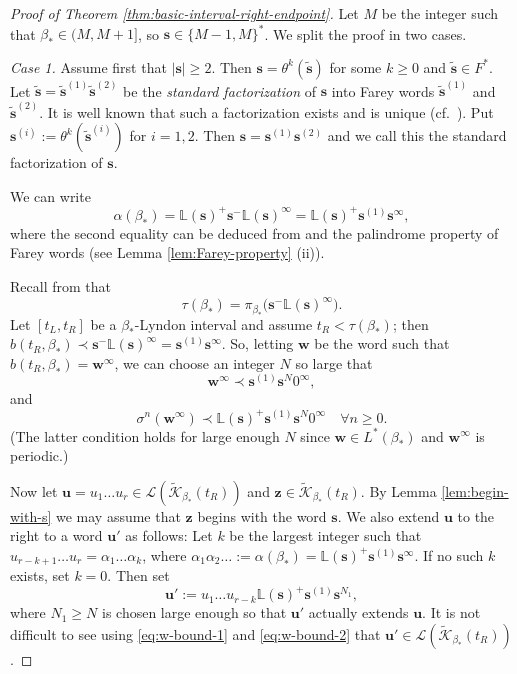 \documentclass[11pt]{amsart}
\theoremstyle{definition}
\theoremstyle{remark}
\numberwithin{equation}{section}
\renewcommand{\L}{\ensuremath{\mathbb{L}}}
\newcommand{\Kt}{\widetilde{\mathcal{K}}}
\newcommand{\s}{ {\mathbf{s}}}
\newcommand{\cL}{\mathcal{L}}
\renewcommand{\u}{\mathbf{u}}
\newcommand{\w}{\mathbf{w}}
\newcommand{\z}{\mathbf{z}}
\newcommand{\f}{\infty}
\begin{document}
\begin{proof}[Proof of Theorem \ref{thm:basic-interval-right-endpoint}]
{Let $M$ be the integer such that $\beta_*\in(M,M+1]$, so $\s\in\{M-1,M\}^*$. We split the proof in two cases.

\medskip
{\em Case 1.} Assume first that $|\s|\geq 2$. Then $\s=\theta^k(\tilde{\s})$ for some $k\geq 0$ and $\tilde{\s}\in F^*$.
Let $\tilde{\s}=\tilde{\s}^{(1)}\tilde{\s}^{(2)}$ be the {\em standard factorization} of $\s$ into Farey words $\tilde{\s}^{(1)}$ and $\tilde{\s}^{(2)}$. It is well known that such a factorization exists and is unique (cf.~\cite{Carminati-Isola-Tiozzo-2018}). Put $\s^{(i)}:=\theta^k(\tilde{\s}^{(i)})$ for $i=1,2$. Then $\s=\s^{(1)}\s^{(2)}$ and we call this the standard factorization of $\s$.}
We can write
\[
\alpha(\beta_*)=\L(\s)^+\s^-\L(\s)^\f=\L(\s)^+\s^{(1)}\s^\f,
\]
where the second equality can be deduced from \cite[Lemma 2.6]{Carminati-Isola-Tiozzo-2018} and the palindrome property of Farey words (see Lemma \ref{lem:Farey-property} (ii)).

Recall from \cite[Theorem 2]{Allaart-Kong-2021} that
\[
\tau(\beta_*)={\pi_{\beta_*}\big( \s^-\L(\s)^\f\big)}.
\]
Let $[t_L,t_R]$ be a $\beta_*$-Lyndon interval and assume $t_R<\tau(\beta_*)$; then $b(t_R,\beta_*)\prec \s^-\L(\s)^\f=\s^{(1)}\s^\f$. So, letting $\w$ be the word such that $b(t_R,\beta_*)=\w^\f$, we can choose an integer $N$ so large that
\begin{equation} \label{eq:w-bound-1}
\w^\f\prec \s^{(1)}\s^N 0^\f,
\end{equation}
and
\begin{equation} \label{eq:w-bound-2}
\sigma^n(\w^\f)\prec \L(\s)^+\s^{(1)}\s^N 0^\infty \quad \forall n\geq 0.
\end{equation}
(The latter condition holds for large enough $N$ since $\w\in L^*(\beta_*)$ and $\w^\f$ is periodic.)

Now let $\u=u_1\dots u_r\in\cL(\Kt_{\beta_*}(t_R))$ and $\z\in \Kt_{\beta_*}(t_R)$. By Lemma \ref{lem:begin-with-s} we may assume that $\z$ begins with the word $\s$. We also extend $\u$ to the right to a word $\u'$ as follows: Let $k$ be the largest integer such that $u_{r-k+1}\dots u_r=\alpha_1\dots\alpha_k$, where $\alpha_1\alpha_2\dots:=\alpha(\beta_*){=\L(\s)^+\s^{(1)}\s^\f}$. If no such $k$ exists, set $k=0$. Then set
\[
\u':=u_1\dots u_{r-k}\L(\s)^+\s^{(1)}\s^{N_1},
\]
where $N_1\geq N$ is chosen large enough so that $\u'$ actually extends $\u$. It is not difficult to see using \eqref{eq:w-bound-1} and \eqref{eq:w-bound-2} that $\u'\in\cL(\Kt_{\beta_*}(t_R))$.


\end{proof}
\end{document}
